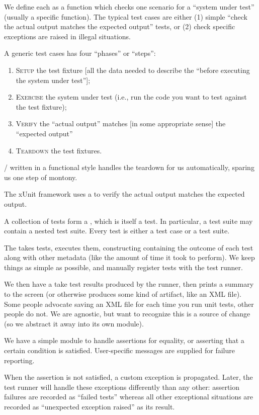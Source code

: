 \begin{node}
We define each  as a function which checks one
scenario for a ``system under test'' (usually a specific
function). The typical test cases are either (1) simple ``check the
actual output matches the expected output'' tests, or (2) check
specific exceptions are raised in illegal situations.

A generic test cases has four ``phases'' or ``steps'':
\begin{enumerate}
\item \textsc{Setup} the test fixture [all the data needed to describe
  the ``before executing the system under test''];
\item \textsc{Exercise} the system under test (i.e., run the code you
  want to test against the test fixture);
\item \textsc{Verify} the ``actual output'' matches [in some
  appropriate sense] the ``expected output''
\item \textsc{Teardown} the test fixtures.
\end{enumerate}
\SML/ written in a functional style handles the teardown for us
automatically, sparing us one step of montony.

The xUnit framework uses a  to verify the
actual output matches the expected output. 

A collection of tests form a , which is itself a
test. In particular, a test suite may contain a nested test
suite. Every test is either a test case or a test suite.

The  takes tests, executes them, constructing
 containing the outcome of each test along with
other metadata (like the amount of time it took to perform). We keep
things as simple as possible, and manually register tests with the
test runner.

We then have a  take test results produced by
the runner, then prints a summary to the screen (or otherwise produces
some kind of artifact, like an XML file). Some people advocate saving
an XML file for each time you run unit tests, other people do not. We
are agnostic, but want to recognize this is a source of change (so we
abstract it away into its own module).
\end{node}

\begin{node}[Assertions]
We have a simple module to handle assertions for equality, or
asserting that a certain condition is satisfied. User-specific
messages are supplied for failure reporting.

When the assertion is not satisfied, a custom {\Tt{}\nwendquote}
exception is propagated. Later, the test runner will handle these
exceptions differently than any other: assertion failures are recorded
as ``failed tests'' whereas all other exceptional situations are
recorded as ``unexpected exception raised'' as its result.
\end{node}

